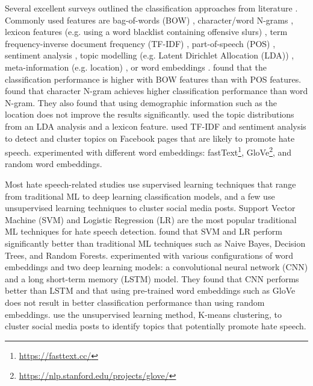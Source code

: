 %
Several excellent surveys outlined the classification approaches from literature  \citep{fortuna2018survey, schmidt2019survey}.
%
Commonly used features are bag-of-words (BOW) \citep{greevy2004classifying}, character/word N-grams \citep{waseem2016hateful}, lexicon features (e.g. using a word blacklist containing offensive slurs) \citep{xiang2012detecting},  term frequency-inverse document frequency (TF-IDF) \citep{badjatiya2017deep, davidson2017automated, rodriguez2019automatic}, part-of-speech (POS) \citep{greevy2004classifying}, sentiment analysis \citep{rodriguez2019automatic}, topic modelling (e.g. Latent Dirichlet Allocation (LDA)) \citep{xiang2012detecting}, meta-information (e.g. location) \citep{waseem2016hateful}, or word embeddings \citep{badjatiya2017deep, agrawal2018deep}.
%
\citet{greevy2004classifying} found that the classification performance is higher with BOW features than with POS features.
%
\citet{waseem2016hateful} found that character N-gram achieves higher classification performance than word N-gram.
%
They also found that using demographic information such as the location does not improve the results significantly.
%
\citet{xiang2012detecting} used the topic distributions from an LDA analysis and a lexicon feature.
%
\citet{rodriguez2019automatic} used TF-IDF and sentiment analysis to detect and cluster topics on Facebook pages that are likely to promote hate speech.
%
\citet{badjatiya2017deep} experimented with different word embeddings: fastText\footnote{\url{https://fasttext.cc/}}, GloVe\footnote{\url{https://nlp.stanford.edu/projects/glove/}}, and random word embeddings.
%

Most hate speech-related studies use supervised learning techniques that range from traditional ML to deep learning classification models, and a few use unsupervised learning techniques to cluster social media posts.
%
Support Vector Machine (SVM) \citep{greevy2004classifying, xiang2012detecting,davidson2017automated} and Logistic Regression (LR) \citep{waseem2016hateful, davidson2017automated} are the most popular traditional ML techniques for hate speech detection.
%
\citet{davidson2017automated} found that SVM and LR perform significantly better than traditional ML techniques such as Naive Bayes, Decision Trees, and Random Forests.
%
\citet{badjatiya2017deep} experimented with various configurations of word embeddings and two deep learning models: a convolutional neural network (CNN) and a long short-term memory (LSTM) model.
%
They found that CNN performs better than LSTM and that using pre-trained word embeddings such as GloVe does not result in better classification performance than using random embeddings.
%
\citet{rodriguez2019automatic} use the unsupervised learning method, K-means clustering, to cluster social media posts to identify topics that potentially promote hate speech.
%

